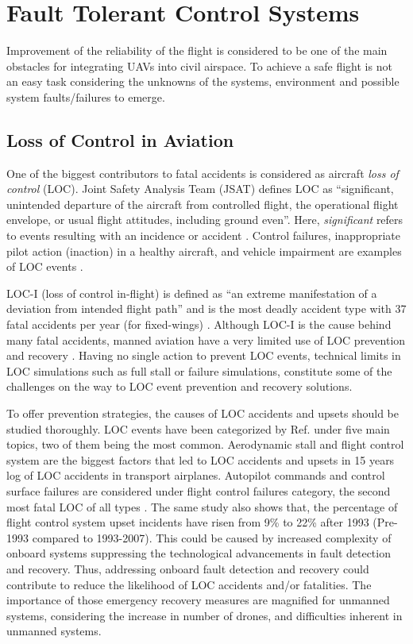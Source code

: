 	
\section{Fault Tolerant Control Systems}

Improvement of the reliability of the flight is considered to be one of the main obstacles for integrating UAVs into civil airspace. 
To achieve a safe flight is not an easy task considering the unknowns of the systems, environment and possible system faults/failures to emerge. 

\subsection{Loss of Control in Aviation}

One of the biggest contributors to fatal accidents is considered as aircraft \emph{loss of control} (LOC). 
Joint Safety Analysis Team (JSAT) defines LOC as ``significant, unintended departure of the aircraft from controlled flight, the operational flight envelope, or usual flight attitudes, including ground even''. Here, \emph{significant} refers to events resulting with an incidence or accident \cite{russell2000joint}. 
Control failures, inappropriate pilot action (inaction) in a healthy aircraft, and vehicle impairment are examples of LOC events \cite{richards2016vehicle}.

LOC-I (loss of control in-flight) is defined as ``an extreme manifestation of a deviation from intended flight path'' and is the most deadly accident type with 37 fatal accidents per year (for fixed-wings) \cite{easa:LOC}.
Although LOC-I is the cause behind many fatal accidents, manned aviation have a very limited use of LOC prevention and recovery \cite{belcastro2017aircraft}. 
Having no single action to prevent LOC events, technical limits in LOC simulations such as full stall or failure simulations, constitute some of the challenges on the way to LOC event prevention and recovery solutions.

To offer prevention strategies, the causes of LOC accidents and upsets should be studied thoroughly. 
LOC events have been categorized by Ref.\cite{lambregts2008airplane} under five main topics, two of them being the most common. 
Aerodynamic stall and flight control system are the biggest factors that led to LOC accidents and upsets in 15 years log of LOC accidents in transport airplanes.
Autopilot commands and control surface failures are considered under flight control failures category, the second most fatal LOC of all types \cite{lambregts2008airplane}. 
The same study also shows that, the percentage of flight control system upset incidents have risen from 9\% to 22\% after 1993 (Pre-1993 compared to 1993-2007).
This could be caused by increased complexity of onboard systems suppressing the technological advancements in fault detection and recovery. 
Thus, addressing onboard fault detection and recovery could contribute to reduce the likelihood of LOC accidents and/or fatalities. 
The importance of those emergency recovery measures are magnified for unmanned systems, considering the increase in number of drones, and difficulties inherent in unmanned systems. 

